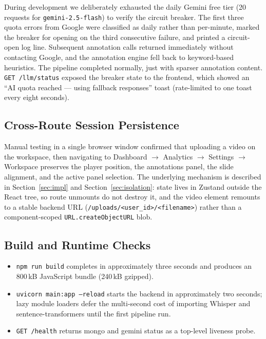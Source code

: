 \documentclass[conference]{IEEEtran}
\begin{document}
During development we deliberately exhausted the daily Gemini free tier (20 requests for \texttt{gemini-2.5-flash}) to verify the circuit breaker. The first three quota errors from Google were classified as daily rather than per-minute, marked the breaker for opening on the third consecutive failure, and printed a circuit-open log line. Subsequent annotation calls returned immediately without contacting Google, and the annotation engine fell back to keyword-based heuristics. The pipeline completed normally, just with sparser annotation content. \texttt{GET /llm/status} exposed the breaker state to the frontend, which showed an ``AI quota reached --- using fallback responses'' toast (rate-limited to one toast every eight seconds).

\subsection{Cross-Route Session Persistence}

Manual testing in a single browser window confirmed that uploading a video on the workspace, then navigating to Dashboard $\to$ Analytics $\to$ Settings $\to$ Workspace preserves the player position, the annotations panel, the slide alignment, and the active panel selection. The underlying mechanism is described in Section~\ref{sec:impl} and Section~\ref{sec:isolation}: state lives in Zustand outside the React tree, so route unmounts do not destroy it, and the video element remounts to a stable backend URL (\texttt{/uploads/<user\_id>/<filename>}) rather than a component-scoped \texttt{URL.createObjectURL} blob.

\subsection{Build and Runtime Checks}

\begin{itemize}
    \item \texttt{npm run build} completes in approximately three seconds and produces an 800\,kB JavaScript bundle (240\,kB gzipped).
    \item \texttt{uvicorn main:app --reload} starts the backend in approximately two seconds; lazy module loaders defer the multi-second cost of importing Whisper and sentence-transformers until the first pipeline run.
    \item \texttt{GET /health} returns mongo and gemini status as a top-level liveness probe.
\end{itemize}
\end{document}

